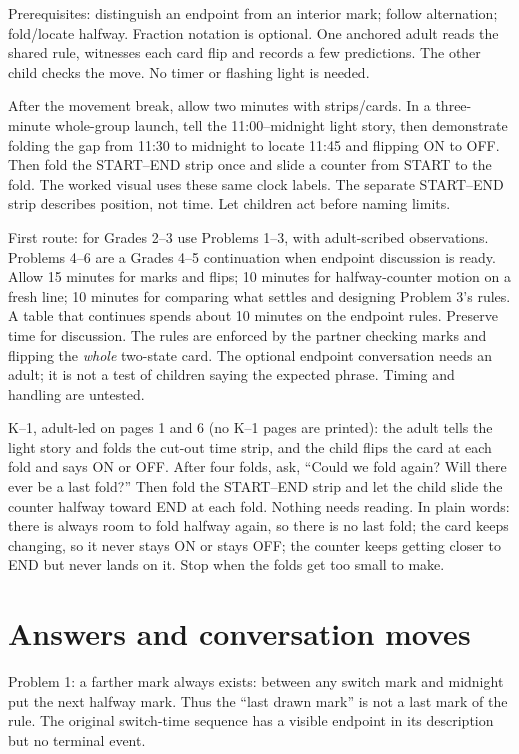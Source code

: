 \documentclass[11pt,letterpaper]{article}
\begin{document}
Prerequisites: distinguish an endpoint from an interior mark; follow alternation; fold/locate halfway. Fraction notation is optional. One anchored adult reads the shared rule, witnesses each card flip and records a few predictions. The other child checks the move. No timer or flashing light is needed.

After the movement break, allow two minutes with strips/cards. In a three-minute whole-group launch, tell the 11:00--midnight light story, then demonstrate folding the gap from 11:30 to midnight to locate 11:45 and flipping ON to OFF. Then fold the START--END strip once and slide a counter from START to the fold. The worked visual uses these same clock labels. The separate START--END strip describes position, not time. Let children act before naming limits.

First route: for Grades 2--3 use Problems 1--3, with adult-scribed observations. Problems 4--6 are a Grades 4--5 continuation when endpoint discussion is ready. Allow 15 minutes for marks and flips; 10 minutes for halfway-counter motion on a fresh line; 10 minutes for comparing what settles and designing Problem 3's rules. A table that continues spends about 10 minutes on the endpoint rules. Preserve time for discussion. The rules are enforced by the partner checking marks and flipping the \emph{whole} two-state card. The optional endpoint conversation needs an adult; it is not a test of children saying the expected phrase. Timing and handling are untested.

K--1, adult-led on pages 1 and 6 (no K--1 pages are printed): the adult tells the light story and folds the cut-out time strip, and the child flips the card at each fold and says ON or OFF. After four folds, ask, ``Could we fold again? Will there ever be a last fold?'' Then fold the START--END strip and let the child slide the counter halfway toward END at each fold. Nothing needs reading. In plain words: there is always room to fold halfway again, so there is no last fold; the card keeps changing, so it never stays ON or stays OFF; the counter keeps getting closer to END but never lands on it. Stop when the folds get too small to make.
\newpage
\section*{Answers and conversation moves}
Problem 1: a farther mark always exists: between any switch mark and midnight put the next halfway mark. Thus the ``last drawn mark'' is not a last mark of the rule. The original switch-time sequence has a visible endpoint in its description but no terminal event.
\end{document}
